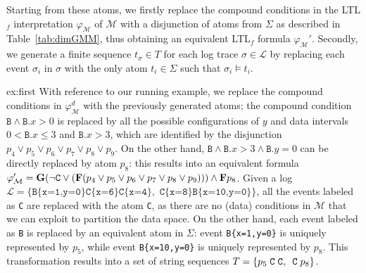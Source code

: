 Starting from these atoms, we firstly replace the compound conditions in the LTL$_f$ interpretation $\varphi_{\mathcal{M}}$ of $\mathcal{M}$ with a disjunction of atoms from $\Sigma$ as described in Table~\ref{tab:dimGMM}, thus obtaining an equivalent LTL$_f$ formula $\varphi_{\mathcal{M}}'$. Secondly, we generate a finite sequence $t_\sigma\in T$ for each log trace $\sigma\in\mathcal{L}$ by replacing each event $\sigma_i$ in $\sigma$ with the only atom $t_i\in \Sigma$ such that $\sigma_i\vDash t_i$.
%

\begin{continueexample}{ex:first}
With reference to our running example, we replace the compound conditions in $\varphi_{\mathcal{M}}^d$ with the previously generated atoms; the compound condition $\texttt{B}\wedge \texttt{B}.x>0$ is replaced by all the possible configurations of $y$ and data intervals $0<\texttt{B}.x\leq 3$ and $\texttt{B}.x>3$, which are identified by the disjunction $p_4\vee p_5\vee p_6\vee p_7\vee p_8\vee p_9$. On the other hand, $\texttt{B}\wedge\texttt{B}.x>3\wedge \texttt{B}.y=0$ can be directly replaced by atom $p_8$: this results into an equivalent formula $\varphi_{\mathcal{M}}'=\mathbf{G}(\neg\texttt{C}\vee(\mathbf{F}(p_4\vee p_5\vee p_6\vee p_7\vee p_8\vee p_9)))\wedge \mathbf{F} p_8$.
Given a log $\mathcal{L}=\{\texttt{B\{x=1,y=0\}C\{x=6\}C\{x=4\}},
\texttt{ C\{x=8\}B\{x=10,y=0\}}\}$,
all the events labeled as \texttt{C} are replaced with the atom \texttt{C}, as there are no (data) conditions in $\mathcal{M}$ that we can exploit to partition the data space. On the other hand, each event labeled as \texttt{B} is replaced by an equivalent atom in $\Sigma$: event \texttt{B\{x=1,y=0\}} is uniquely represented by $p_5$, while event \texttt{B\{x=10,y=0\}} is uniquely represented by $p_8$. %
This transformation results into a set of string sequences $T=\{{ p_5\;\texttt{C\;C}}, \texttt{ C}\;p_8\}$.

\end{continueexample}


